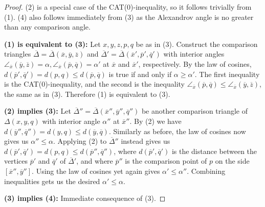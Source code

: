 \documentclass[11pt, a4paper, oneside]{memoir}
\theoremstyle{plain}\newtheorem{theorem}[subsection]{Theorem}
\theoremstyle{definition}
\begin{document}
\begin{proof}
(2) is a special case of the CAT(0)-inequality, so it follows trivially from (1).
(4) also follows immediately from (3) as the Alexandrov angle is no greater than any comparison angle.

\textbf{(1) is equivalent to (3):}
Let \(x,y,z,p,q\) be as in (3).
Construct the comparison triangles \(\overline{\Delta}=\overline{\Delta}(\overline{x},\overline{y},\overline{z})\) and \(\overline{\Delta}'=\overline{\Delta}(\overline{x}',\overline{p}',\overline{q}')\) with interior angles \(\angle_{\overline{x}}(\overline{y},\overline{z})=\alpha,\angle_{\overline{x}}(\overline{p},\overline{q})=\alpha'\) at \(\overline{x}\) and \(\overline{x}'\), respectively.
By the law of cosines, \(d(\overline{p}',\overline{q}')=d(p,q)\leq d(\overline{p},\overline{q})\) is true if and only if \(\alpha\geq \alpha'\).
The first inequality is the CAT(0)-inequality, and the second is the inequality \(\angle_{\overline{x}}(\overline{p},\overline{q})\leq\angle_{\overline{x}}(\overline{y},\overline{z})\), the same as in (3).
Therefore (1) is equivalent to (3).

\textbf{(2) implies (3):}
Let \(\overline{\Delta}''=\overline{\Delta}(\overline{x}'',\overline{y}'',\overline{q}'')\) be another comparison triangle of \(\Delta(x,y,q)\) with interior angle \(\alpha''\) at \(\overline{x}''\).
By (2) we have \(d(\overline{y}'',\overline{q}'')=d(y,q)\leq d(\overline{y},\overline{q})\).
Similarly as before, the law of cosines now gives us \(\alpha''\leq \alpha\).
Applying (2) to \(\overline{\Delta}''\) instead gives us \(d(\overline{p}',\overline{q}')=d(p,q)\leq d(\overline{p}'',\overline{q}'')\), where \(d(\overline{p}',\overline{q}')\) is the distance between the vertices \(\overline{p}'\) and \(\overline{q}'\) of \(\overline{\Delta}'\), and where \(\overline{p}''\) is the comparison point of \(p\) on the side \([\overline{x}'',\overline{y}'']\).
Using the law of cosines yet again gives \(\alpha'\leq\alpha''\).
Combining inequalities gets us the desired \(\alpha'\leq\alpha\).

\textbf{(3) implies (4):}
Immediate consequence of (3).


\end{proof}
\end{document}
